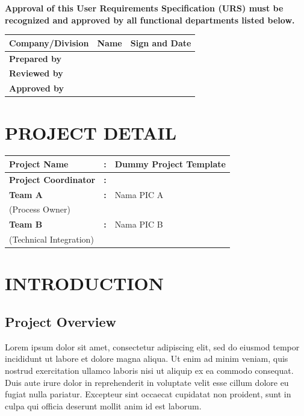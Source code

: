 \documentclass[12pt,a4paper]{article}
\begin{document}
\textbf{Approval of this User Requirements Specification (URS) must be recognized and approved by all functional departments listed below.}

\vspace{0.5cm}

\begin{longtable}{|p{4cm}|p{5cm}|p{4cm}|}
\hline
\textbf{Company/Division} & \textbf{Name} & \textbf{Sign and Date} \\
\hline
\textbf{Prepared by} & & \\
\hline
\textbf{Reviewed by} & & \\
\hline
\textbf{Approved by} & & \\
\hline
\end{longtable}

\newpage

\section*{PROJECT DETAIL}

\begin{longtable}{|p{5cm}|c|p{7cm}|}
\hline
\textbf{Project Name} & \textbf{:} & Dummy Project Template \\
\hline
\textbf{Project Coordinator} & \textbf{:} & \\
\hline
\hline
\textbf{Team A} & \textbf{:} & Nama PIC A \\
(Process Owner) & & \\
\hline
\textbf{Team B} & \textbf{:} & Nama PIC B \\
(Technical Integration) & & \\
\hline
\end{longtable}

\newpage

\tableofcontents

\newpage

\section{INTRODUCTION}

\subsection{Project Overview}
Lorem ipsum dolor sit amet, consectetur adipiscing elit, sed do eiusmod tempor incididunt ut labore et dolore magna aliqua. Ut enim ad minim veniam, quis nostrud exercitation ullamco laboris nisi ut aliquip ex ea commodo consequat.
Duis aute irure dolor in reprehenderit in voluptate velit esse cillum dolore eu fugiat nulla pariatur. Excepteur sint occaecat cupidatat non proident, sunt in culpa qui officia deserunt mollit anim id est laborum.
\end{document}

